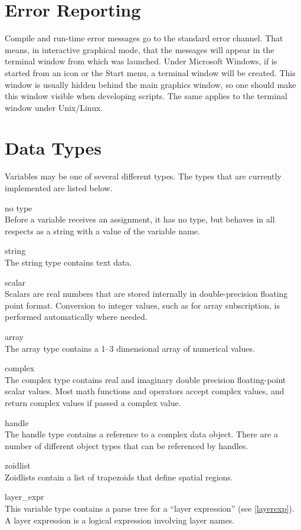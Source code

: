\section{Error Reporting}

Compile and run-time error messages go to the standard error channel. 
That means, in interactive graphical mode, that the messages will
appear in the terminal window from which {\Xic} was launched.  Under
Microsoft Windows, if {\Xic} is started from an icon or the {\cb
Start} menu, a terminal window will be created.  This window is
usually hidden behind the main graphics window, so one should make
this window visible when developing scripts.  The same applies to the
terminal window under Unix/Linux.

\section{Data Types}

Variables may be one of several different types.  The types that
are currently implemented are listed below.
\begin{description}
\item{no type}\\
Before a variable receives an assignment, it has no type, but behaves
in all respects as a string with a value of the variable name.
\item{string}\\
The string type contains text data.
\item{scalar}\\
Scalars are real numbers that are stored internally in
double-precision floating point format.  Conversion to integer values,
such as for array subscription, is performed automatically where
needed.
\item{array}\\
The array type contains a 1--3 dimensional array of numerical values.
\item{complex}\\
The complex type contains real and imaginary double precision
floating-point scalar values.  Most math functions and operators
accept complex values, and return complex values if passed a complex
value.
\item{handle}\\
The handle type contains a reference to a complex data object.  There
are a number of different object types that can be referenced by
handles.
\item{zoidlist}\\
Zoidlists contain a list of trapezoids that define spatial regions.
\item{layer\_expr}\\
This variable type contains a parse tree for a ``layer expression''
(see \ref{layerexp}).  A layer expression is a logical expression
involving layer names.
\end{description}

